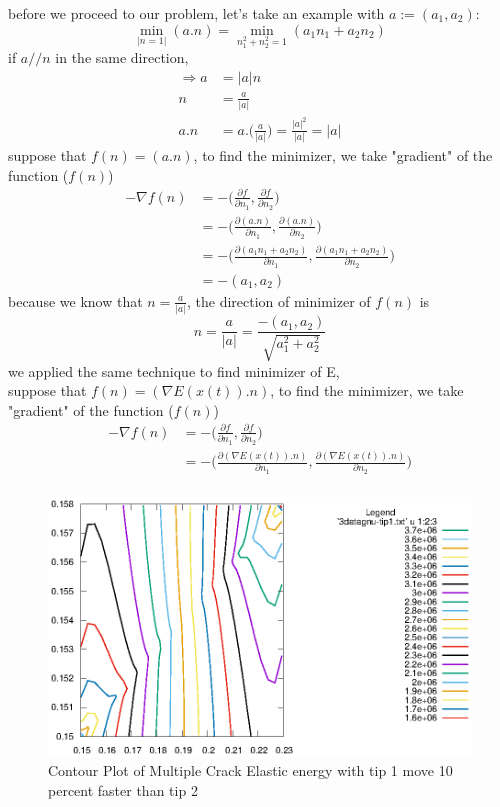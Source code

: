 \documentclass[a4paper,11pt]{article}
\begin{document}
before we proceed to our problem, let's take an example with $a:=(a_1,a_2)$:
\begin{equation}
\min_{|n=1|}(a.n) = \min_{n_1^2 + n_2^2 = 1}(a_1n_1 + a_2n_2)
\end{equation}
if $a//n$ in the same direction,
\begin{equation}
\begin{aligned}
\Rightarrow a &= |a|n\\
n&=\frac{a}{|a|}\\
a.n &= a.\bigg(\frac{a}{|a|}\bigg) =\frac{|a|^2}{|a|} = |a|
\end{aligned}
\end{equation}
suppose that $f(n) = (a.n)$, to find the minimizer, we take "gradient" of the function ($f(n)$)
\begin{equation}
\begin{aligned}
-\nabla f(n) &= - \bigg(\frac{\partial f}{\partial n_1}, \frac{\partial f}{\partial n_2} \bigg)\\
&= - \bigg( \frac{\partial (a.n)}{\partial n_1}, \frac{\partial (a.n)}{\partial n_2} \bigg)\\
&= - \bigg( \frac{\partial (a_1n_1 + a_2n_2)}{\partial n_1}, \frac{\partial (a_1n_1 + a_2n_2)}{\partial n_2} \bigg)\\
&= - (a_1,a_2)
\end{aligned}
\end{equation}
because we know that $n=\frac{a}{|a|}$, the direction of minimizer of $f(n)$ is
\begin{equation}
n = \frac{a}{|a|} = \frac{-(a_1,a_2)}{\sqrt{a_1^2 + a_2^2}}
\end{equation}
we applied the same technique to find minimizer of E,\\
suppose that $f(n) = (\nabla E(x(t)).n)$, to find the minimizer, we take "gradient" of the function ($f(n)$)
\begin{equation}
\begin{aligned}
-\nabla f(n) &= - \bigg(\frac{\partial f}{\partial n_1}, \frac{\partial f}{\partial n_2} \bigg)\\
&= - \bigg( \frac{\partial (\nabla E(x(t)).n)}{\partial n_1}, \frac{\partial (\nabla E(x(t)).n)}{\partial n_2} \bigg)\\
\end{aligned}
\end{equation}
\begin{figure}[h]
	\centering
	\includegraphics[width=0.7\linewidth]{picture/conference/elasticdouble-tip1}
	\caption{Contour Plot of Multiple Crack Elastic energy with tip 1 move 10 percent faster than tip 2}
	\label{fig:elasticdouble-tip1}
\end{figure}
\end{document}
